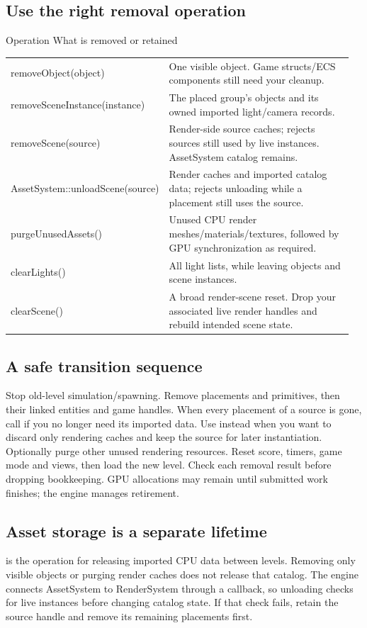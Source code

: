 \documentclass[11pt,a4paper]{article}
\begin{document}
\subsection*{Use the right removal operation}
Operation                                           What is removed or retained

{\small
\begin{longtable}{@{}p{0.42\linewidth}p{0.54\linewidth}@{}}
removeObject(object) & One visible object. Game structs/ECS components still need your cleanup. \\
removeSceneInstance(instance) & The placed group's objects and its owned imported light/camera records. \\
removeScene(source) & Render-side source caches; rejects sources still used by live instances. AssetSystem catalog remains. \\
AssetSystem::unloadScene(source) & Render caches and imported catalog data; rejects unloading while a placement still uses the source. \\
purgeUnusedAssets() & Unused CPU render meshes/materials/textures, followed by GPU synchronization as required. \\
clearLights() & All light lists, while leaving objects and scene instances. \\
clearScene() & A broad render-scene reset. Drop your associated live render handles and rebuild intended scene state. \\
\end{longtable}
}

\subsection*{A safe transition sequence}
Stop old-level simulation/spawning. Remove placements and primitives, then their linked entities and game handles. When every placement of a source is gone, call  if you no longer need its imported data. Use  instead when you want to discard only rendering caches and keep the source for later instantiation. Optionally purge other unused rendering resources. Reset score, timers, game mode and views, then load the new level. Check each removal result before dropping bookkeeping. GPU allocations may remain until submitted work finishes; the engine manages retirement.

\clearpage
\subsection*{Asset storage is a separate lifetime}
 is the operation for releasing imported CPU data between levels. Removing only visible objects or purging render caches does not release that catalog. The engine connects AssetSystem to RenderSystem through a callback, so unloading checks for live instances before changing catalog state. If that check fails, retain the source handle and remove its remaining placements first.
\end{document}
